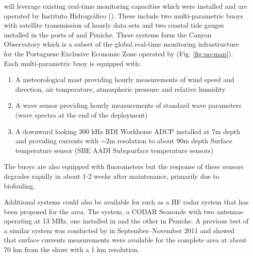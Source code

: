 \proj will leverage existing real-time monitoring capacities which
were installed and are operated by Instituto Hidrogr\'{a}fico
(\inste). These include two multi-parametric buoys with satellite
transmission of hourly data sets and two coastal tide gauges installed
in the ports of \naz and Peniche. These systems form the \naz Canyon
Observatory which is a subset of the global real-time monitoring
infrastructure for the Portuguese Exclusive Economic Zone operated by
\inst (Fig. \ref{fig:po-map}). %
Each multi-parametric buoy is equipped with:

\begin{enumerate}[noitemsep,topsep=0pt,parsep=0pt,partopsep=0pt]

  \item A meteorological mast providing hourly measurements of wind speed and
    direction, air temperature, atmospheric pressure and relative
    humidity

  \item A wave sensor providing hourly measurements of standard wave parameters
    (wave spectra at the end of the deployment)

  \item A downward looking 300 kHz RDI Workhorse ADCP installed at 7m
    depth and providing currents with $\sim 2$m resolution to about 90m
    depth Surface temperature sensor (SBE AADI Subqsurface temperature
    sensors)

\end{enumerate}  

\noindent
The buoys are also equipped with fluorometers but the response of these
sensors degrades rapidly in about 1-2 weeks after maintenance,
primarily due to biofouling.

Additional systems could also be available for \proj such as %
a HF radar system that has been proposed for the \naz area. The
system, a CODAR Seasonde with two antennas operating at 13 MHz, one
installed in \naz and the other in Peniche. A previous test of a
similar system was conducted by \inst in September--November 2011 and
showed that surface currents measurements were available for the
complete area at about 70 km from the shore with a 1 km resolution.

